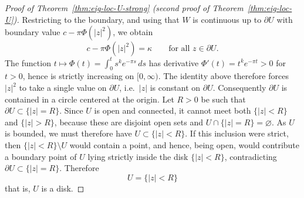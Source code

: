 \documentclass[a4paper,11pt,reqno]{amsart}
\numberwithin{equation}{section}
\theoremstyle{plain} %
\theoremstyle{definition} %
\theoremstyle{remark}
\begin{document}
\begin{proof}[Proof of Theorem~\ref{thm:eig-loc-U-strong} (second proof of Theorem~\ref{thm:eig-loc-U})]
Restricting to the boundary, and using that \(W\) is continuous up to \(\partial U\) with
boundary value \(c-\pi\Phi(|z|^2)\), we obtain
\[
c-\pi\Phi(|z|^2)=\kappa
\qquad\text{for all }z\in\partial U.
\]
The function \(t\mapsto \Phi(t)=\int_0^t s^k e^{-\pi s}\,ds\) has derivative
\(\Phi'(t)=t^k e^{-\pi t}>0\) for \(t>0\), hence is strictly increasing on \([0,\infty)\). The
identity above therefore forces \(|z|^2\) to take a single value on \(\partial U\), i.e.\ \(|z|\)
is constant on \(\partial U\). Consequently \(\partial U\) is contained in a circle centered at
the origin. Let \(R>0\) be such that
\(\partial U\subset \{|z|=R\}\). Since \(U\) is open and connected, it cannot meet both
\(\{|z|<R\}\) and \(\{|z|>R\}\), because these are disjoint open sets and \(U\cap \{|z|=R\}=\varnothing\).
As \(U\) is bounded, we must therefore have \(U\subset \{|z|<R\}\). If this inclusion were strict,
then \(\{|z|<R\}\setminus U\) would contain a point, and hence, being open, would contribute a
boundary point of \(U\) lying strictly inside the disk \(\{|z|<R\}\), contradicting
\(\partial U\subset \{|z|=R\}\). Therefore
\[
U=\{|z|<R\}
\]
that is, \(U\) is a disk.
\end{proof}
\end{document}
